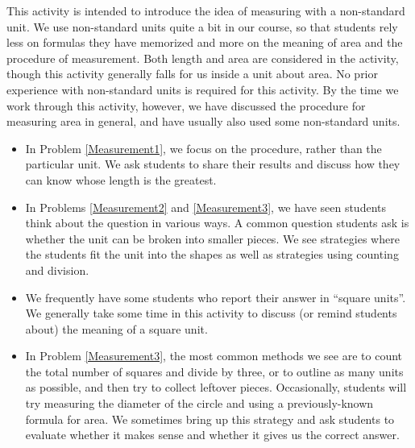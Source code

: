 \documentclass{ximera}
\begin{document}
\newpage

\begin{instructorNotes}
This activity is intended to introduce the idea of measuring with a non-standard unit.  We use non-standard units quite a bit in our course, so that students rely less on formulas they have memorized and more on the meaning of area and the procedure of measurement. Both length and area are considered in the activity, though this activity generally falls for us inside a unit about area. No prior experience with non-standard units is required for this activity.  By the time we work through this activity, however, we have discussed the procedure for measuring area in general, and have usually also used some non-standard units.
\begin{itemize}
    \item In Problem \ref{Measurement1}, we focus on the procedure, rather than the particular unit.  We ask students to share their results and discuss how they can know whose length is the greatest.
    \item In Problems \ref{Measurement2} and \ref{Measurement3}, we have seen students think about the question in various ways.  A common question students ask is whether the unit can be broken into smaller pieces.  We see strategies where the students fit the unit into the shapes as well as strategies using counting and division.
    \item We frequently have some students who report their answer in ``square units''.  We generally take some time in this activity to discuss (or remind students about) the meaning of a square unit. 
    \item In Problem \ref{Measurement3}, the most common methods we see are to count the total number of squares and divide by three, or to outline as many units as possible, and then try to collect leftover pieces.  Occasionally, students will try  measuring the diameter of the circle and using a previously-known formula for area.  We sometimes bring up this strategy and ask students to evaluate whether it makes sense and whether it gives us the correct answer.
\end{itemize}





\end{instructorNotes}
\end{document}
